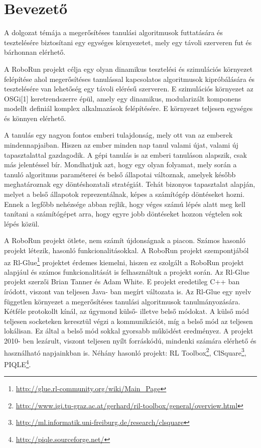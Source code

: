 \chapter{Bevezető}\label{ch:BEVEZET}

	A dolgozat témája a megerősítéses tanulási algoritmusok futtatására és tesztelésére biztosítani egy egységes környezetet, mely egy távoli szerveren fut és bárhonnan elérhető.

	A RoboRun projekt célja egy olyan dinamikus tesztelési és szimulációs környezet felépítése ahol megerősítéses tanulással kapcsolatos algoritmusok kipróbálására és tesztelésére van lehetőség egy távoli elérésű szerveren. E szimulációs környezet az OSGi[1] keretrendszerre épül, amely egy dinamikus, modularizált komponens modellt definiál komplex alkalmazások felépítésére. E környezet teljesen egységes és könnyen elérhető. 
	
	A tanulás egy nagyon fontos emberi tulajdonság, mely ott van az emberek mindennapjaiban. Hiszen az ember minden nap tanul valami újat, valami új tapasztalattal gazdagodik. A gépi tanulás is az emberi tanuláson alapszik, csak más jelentéssel bír. Mondhatjuk azt, hogy egy olyan folyamat, mely során a tanuló algoritmus paraméterei és belső állapotai változnak, amelyek később meghatároznak egy döntéshozatali stratégiát. Tehát bizonyos tapasztalat alapján, melyet a belső állapotok reprezentálnak, képes a számítógép döntéseket hozni. Ennek a legfőbb nehézsége abban rejlik, hogy véges számú lépés alatt meg kell tanítani a számítógépet arra, hogy egyre jobb döntéseket hozzon végtelen sok lépés közül.
	
	A RoboRun projekt ötlete, nem számít újdonságnak a piacon. Számos hasonló projekt létezik, hasonló funkcionalitásokkal. A RoboRun projekt szempontjából az Rl-Glue\footnote{\href {http://glue.rl-community.org/wiki/Main_Page}{http://glue.rl-community.org/wiki/Main_Page}} projektet érdemes kiemelni, hiszen ez szolgált a RoboRun projekt alapjául és számos funkcionalitását is felhasználtuk a projekt során. Az Rl-Glue projekt szerzői Brian Tanner és Adam White. E projekt eredetileg C++ ban íródott, viszont van teljesen Java- ban megírt változata is. Az Rl-Glue egy nyelv független környezet a megerősítéses tanulási algoritmusok tanulmányozására. Kétféle protokollt kínál, az úgymond külső- illetve belső módokat. A külső mód teljesen socketeken keresztül végzi a kommunikációt, míg a belső mód az teljesen lokálisan. Ez által a belső mód sokkal gyorsabb működést eredményez. A projekt 2010- ben lezárult, viszont teljesen nyílt forráskódú, mindenki számára elérhető és használható napjainkban is. Néhány hasonló projekt: RL Toolbox\footnote{\href {http://www.igi.tu-graz.ac.at/gerhard/ril-toolbox/general/overview.html}{http://www.igi.tu-graz.ac.at/gerhard/ril-toolbox/general/overview.html}}, ClSquare\footnote{\href {http://ml.informatik.uni-freiburg.de/research/clsquare}{http://ml.informatik.uni-freiburg.de/research/clsquare}}, PIQLE\footnote{\href{http://piqle.sourceforge.net/}{http://piqle.sourceforge.net/}}. 



